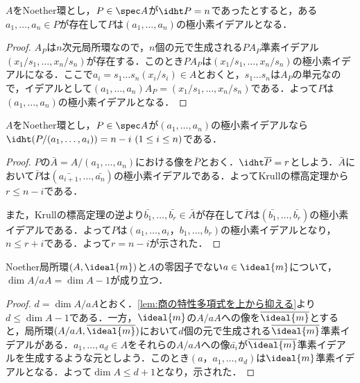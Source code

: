 \begin{thm}[Krullの標高定理の逆]
	$A$をNoether環とし，$P\in\spec A$が$\idht P=n$であったとすると，ある$a_1,\dots,a_n\in P$が存在して$P$は$(a_1,\dots,a_n)$の極小素イデアルとなる．
\end{thm}

\begin{proof}
	$A_P$は$n$次元局所環なので，$n$個の元で生成される$PA_P$準素イデアル$(x_1/s_1,\dots,x_n/s_n)$が存在する．このとき$PA_P$は$(x_1/s_1,\dots,x_n/s_n)$の極小素イデアルになる．ここで$a_i=s_1\dots s_n(x_i/s_i)\in A$とおくと，$s_1\dots s_n$は$A_P$の単元なので，イデアルとして$(a_1,\dots,a_n)A_P=(x_1/s_1,\dots,x_n/s_n)$である．よって$P$は$(a_1,\dots,a_n)$の極小素イデアルとなる．
\end{proof}

\begin{prop}\label{prop:標高定理の系}
	$A$をNoether環とし，$P\in\spec A$が$(a_1,\dots,a_n)$の極小素イデアルなら$\idht (P/(a_1,\dots,a_i))=n-i ~(1\leq i\leq n)$である．
\end{prop}

\begin{proof}
	$P$の$\bar{A}=A/(a_1,\dots,a_n)$における像を$\bar{P}$とおく．$\idht \bar{P}=r$としよう．$\bar{A}$において$\bar{P}$は$(\bar{a_{i+1}},\dots,\bar{a_n})$の極小素イデアルである．よってKrullの標高定理から$r\leq n-i$である．
	
	また，Krullの標高定理の逆より$\bar{b_1},\dots,\bar{b_r}\in\bar{A}$が存在して$\bar{P}$は$(\bar{b_1},\dots,\bar{b_r})$の極小素イデアルである．よって$P$は$(a_1,\dots,a_i，b_1,\dots,b_r)$の極小素イデアルとなり，$n\leq r+i$である．よって$r=n-i$が示された．
\end{proof}

\begin{prop}\label{prop:dim A/aA=dim A-1}
	Noether局所環$(A,\ideal{m})$と$A$の零因子でない$a\in\ideal{m}$について，$\dim A/aA=\dim A-1$が成り立つ．
\end{prop}

\begin{proof}
	$d=\dim A/aA$とおく．\ref{lem:商の特性多項式を上から抑える}より$d\leq \dim A-1$である．一方，$\ideal{m}$の$A/aA$への像を$\bar{\ideal{m}}$とすると，局所環$(A/aA,\bar{\ideal{m}})$において$d$個の元で生成される$\bar{\ideal{m}}$準素イデアルがある．$a_1,\dots,a_d\in A$をそれらの$A/aA$への像$\bar{a_i}$が$\bar{\ideal{m}}$準素イデアルを生成するような元としよう．このとき$(a，a_1,\dots,a_d)$は$\ideal{m}$準素イデアルとなる．よって$\dim A\leq d+1$となり，示された．
\end{proof}


